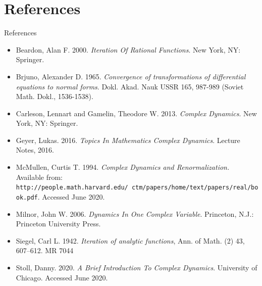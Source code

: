 \section{References}
\begin{frame}{References}
\footnotesize

\begin{itemize}
\item Beardon, Alan F. 2000. \textit{Iteration Of Rational Functions}. New York, NY: Springer.

\item
Brjuno, Alexander D. 1965. \textit{Convergence of transformations of differential equations to normal forms}. Dokl. Akad. Nauk USSR 165, 987-989
(Soviet Math. Dokl., 1536-1538).

\item
Carleson, Lennart and Gamelin, Theodore W. 2013. \textit{Complex Dynamics}. New York, NY: Springer.

\item
Geyer, Lukas. 2016. \textit{Topics In Mathematics Complex Dynamics}. Lecture Notes, 2016.

\item
McMullen, Curtis T. 1994. \textit{Complex Dynamics and Renormalization.} Available from: \texttt{http://people.math.harvard.edu/~ctm/papers/home/text/papers/real/book.pdf}. Accessed June 2020.

\item
Milnor, John W. 2006. \textit{Dynamics In One Complex Variable}. Princeton, N.J.: Princeton University Press.

\item
Siegel, Carl L. 1942. \textit{Iteration of analytic functions}, Ann. of Math. (2) 43, 607–612. MR 7044

\item
Stoll, Danny. 2020. \textit{A Brief Introduction To Complex Dynamics}. University of Chicago. Accessed June 2020.
\end{itemize}
\end{frame}
